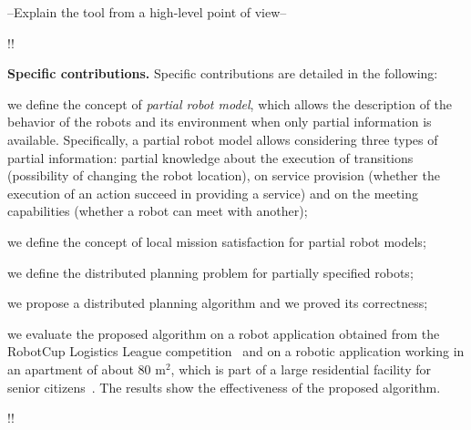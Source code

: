 --Explain the tool from a high-level point of view--

!!

\textbf{Specific contributions.} Specific contributions are detailed in the following:
\begin{enumerate*}
\item we define the concept of \emph{partial robot model}, which allows the description of the behavior of the robots and its environment when only partial information is available. 
Specifically, a partial robot model allows considering three types of partial information: partial knowledge about the execution of transitions (possibility of changing the robot location), on service provision (whether the execution of an action succeed in providing a service) and on the meeting capabilities (whether a robot can meet with another);
\item we define the concept of local mission satisfaction for partial robot models;
\item we define the distributed planning problem for partially specified robots;
\item we propose a distributed planning algorithm and we proved its correctness;
\item we evaluate the proposed algorithm on a robot application obtained from the RobotCup Logistics League competition~\cite{karrasrobocup} and
on a robotic application working in an apartment of about 80 m$^2$, which is part of a large residential facility for senior citizens~\cite{map}.
The results show the effectiveness of the proposed algorithm.
\end{enumerate*}

!!

